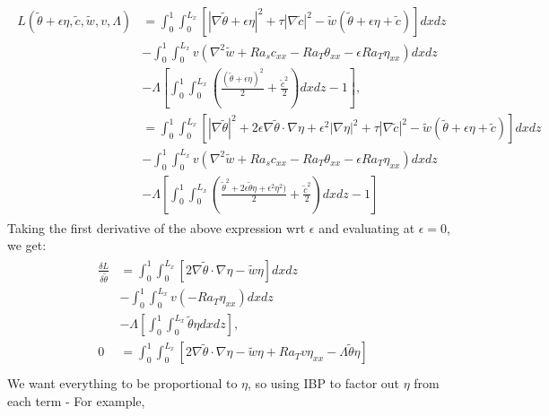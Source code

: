 \documentclass{article}
\newcommand{\grad}[1]{\nabla{#1}}
\newcommand{\lap}[1]{\nabla^{2}{#1}}
\begin{document}
\begin{align}
 \begin{split}
  L(\tilde{\theta} + \epsilon \eta, \tilde{c}, \tilde{w}, v, \Lambda) & = \int_{0}^{1} \int_{0}^{L_{x}} \left[|\grad{\tilde{\theta}} + \epsilon \eta|^{2} + \tau |\grad{\tilde{c}}|^{2} - \tilde{w} (\tilde{\theta} + \epsilon \eta + \tilde{c}) \right] dxdz \\
   &- \int_{0}^{1} \int_{0}^{L_{x}} v (\lap{\tilde{w}} + Ra_{s} c_{xx} - Ra_{T} \theta_{xx} - \epsilon Ra_{T} \eta_{xx} ) dxdz \\
   &- \Lambda \left[\int_{0}^{1} \int_{0}^{L_{x}}  \left(\frac{(\tilde{\theta} +\epsilon \eta)^{2}}{2} + \frac{\tilde{c}^{2}}{2}  \right) dx dz - 1\right] ,\\ 
   & = \int_{0}^{1} \int_{0}^{L_{x}} \left[|\grad{\tilde{\theta}}|^{2} + 2\epsilon \grad{\tilde{\theta}}\cdot \grad{\eta} + \epsilon^{2}|\grad{\eta}|^{2} +\tau |\grad{\tilde{c}}|^{2}  - \tilde{w} (\tilde{\theta} + \epsilon \eta + \tilde{c}) \right] dxdz \\
   &- \int_{0}^{1} \int_{0}^{L_{x}} v (\lap{\tilde{w}} + Ra_{s} c_{xx} - Ra_{T} \theta_{xx} - \epsilon Ra_{T} \eta_{xx} ) dxdz \\
   &- \Lambda \left[\int_{0}^{1} \int_{0}^{L_{x}}  \left(\frac{\tilde{\theta}^{2} +2\epsilon \tilde{\theta}\eta + \epsilon^{2}\eta^{2})}{2} + \frac{\tilde{c}^{2}}{2}  \right) dx dz - 1\right]
 \end{split}
\end{align}
%
Taking the first derivative of the above expression wrt $\epsilon$ and evaluating at $\epsilon = 0$, we get:
\begin{align}
 \begin{split}
  \frac{\delta L}{\delta \tilde{\theta}} & = \int_{0}^{1} \int_{0}^{L_{x}} \left[2 \grad{\tilde{\theta}}\cdot \grad{\eta} - \tilde{w} \eta \right] dxdz \\
   &- \int_{0}^{1} \int_{0}^{L_{x}} v (-Ra_{T} \eta_{xx} ) dxdz \\
   &- \Lambda \left[\int_{0}^{1} \int_{0}^{L_{x}} \tilde{\theta}\eta  dx dz \right], \\
   0 & = \int_{0}^{1} \int_{0}^{L_{x}}\left[2\grad{\tilde{\theta}} \cdot \grad{\eta} - \tilde{w}\eta + Ra_{T} v \eta_{xx} - \Lambda \tilde{\theta}\eta \right]\\
 \end{split}
\end{align}
We want everything to be proportional to $\eta$, so using IBP to factor out $\eta$ from each term - For example,
\end{document}
